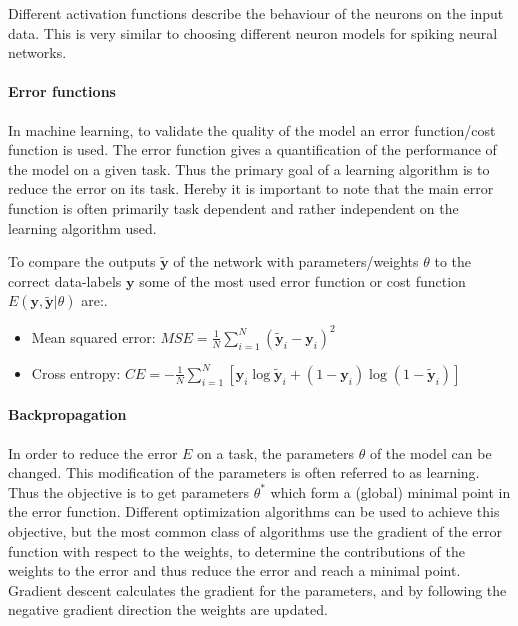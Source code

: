 Different activation functions describe the behaviour of the neurons on the input data.
This is very similar to choosing different neuron models for spiking neural networks.


\paragraph{Error functions} \label{c:mlperr}

In machine learning, to validate the quality of the model an error function/cost function is used.
The error function gives a quantification of the performance of the model on a given task.
Thus the primary goal of a learning algorithm is to reduce the error on its task.
Hereby it is important to note that the main error function is often primarily task dependent and rather independent on the learning algorithm used.  

To compare the outputs $\tilde{\textbf{y}}$ of the network with parameters/weights $\theta$ to the correct data-labels $\textbf{y}$ some of the most used error function or cost function $E(\textbf{y},\tilde{\textbf{y}} | \theta)$ are:.

\begin{itemize}
	\item Mean squared error: $MSE = \frac{1}{N} \sum_{i=1}^N (\tilde{\textbf{y}}_i - \textbf{y}_i)^2 $
	\item Cross entropy: $CE = - \frac{1}{N} \sum_{i=1}^N [ \textbf{y}_i \log \tilde{\textbf{y}}_i + (1 - \textbf{y}_i) \log (1 - \tilde{\textbf{y}}_i)]$
\end{itemize}

\paragraph{Backpropagation} \label{c:backprop}

In order to reduce the error $E$ on a task, the parameters $\theta$ of the model can be changed.
This modification of the parameters is often referred to as learning.
Thus the objective is to get parameters $\theta^*$ which form a (global) minimal point in the error function. 
Different optimization algorithms can be used to achieve this objective, but the most common class of algorithms use the gradient of the error function with respect to the weights, to determine the contributions of the weights to the error and thus reduce the error and reach a minimal point.
Gradient descent calculates the gradient for the parameters, and by following the negative gradient direction the weights are updated.

